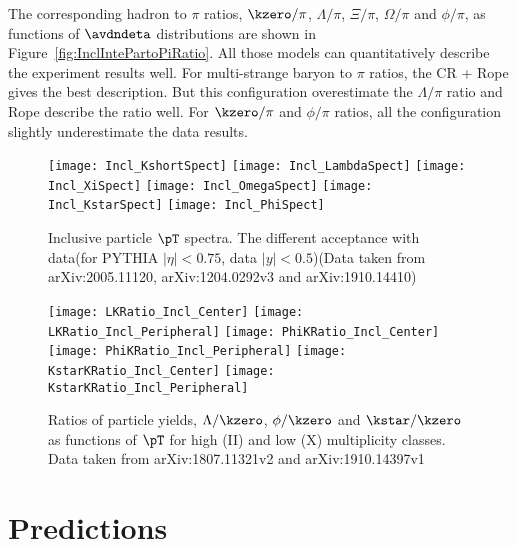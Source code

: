 \documentclass[ALICE,manyauthors]{StrinJet}
\begin{document}
The corresponding hadron to $\pi$ ratios,  $\kzero/\pi$, $\Lambda/\pi$, $\Xi/\pi$, $\Omega/\pi$ and $\phi/\pi$, as functions of $\avdndeta$ distributions are shown in Figure~\ref{fig:InclIntePartoPiRatio}. 
All those models can quantitatively describe the experiment results well. For multi-strange baryon to $\pi$ ratios, the CR + Rope gives the best description. But this configuration overestimate the $\Lambda/\pi$ ratio and Rope describe the ratio well. For $\kzero/\pi$ and $\phi/\pi$ ratios, all the configuration slightly underestimate the data results.
\begin{figure}[ht]
	\begin{center}
		\texttt{[image: Incl\_KshortSpect]}
		\texttt{[image: Incl\_LambdaSpect]}
		\texttt{[image: Incl\_XiSpect]}
		\texttt{[image: Incl\_OmegaSpect]}
		\texttt{[image: Incl\_KstarSpect]}
		\texttt{[image: Incl\_PhiSpect]}
	\end{center}
	\caption{Inclusive particle $\pT$ spectra. The different acceptance with data(for PYTHIA $|\eta|<0.75$, data $|y|<0.5$)(Data taken from arXiv:2005.11120, arXiv:1204.0292v3 and arXiv:1910.14410)}
	\label{fig:InclParSpect}
\end{figure}

\begin{figure}[ht]
	\begin{center}
		\texttt{[image: LKRatio\_Incl\_Center]}
		\texttt{[image: LKRatio\_Incl\_Peripheral]}
		\texttt{[image: PhiKRatio\_Incl\_Center]}
		\texttt{[image: PhiKRatio\_Incl\_Peripheral]}
		\texttt{[image: KstarKRatio\_Incl\_Center]}
		\texttt{[image: KstarKRatio\_Incl\_Peripheral]}
	\end{center}
	\caption{Ratios of particle yields, $\Lambda/\kzero$, $\phi/\kzero$ and $\kstar/\kzero$ as functions of $\pT$ for high (II) and low (X) multiplicity classes. Data taken from arXiv:1807.11321v2 and arXiv:1910.14397v1}
	\label{fig:InclParRatioCentPeri}
\end{figure}

\clearpage
\section{Predictions}
\label{sec:predic}
\end{document}

